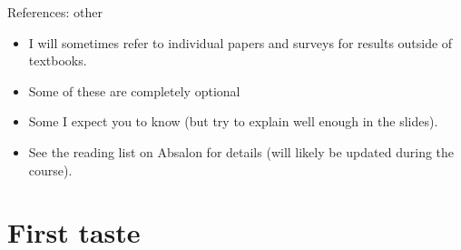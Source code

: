\documentclass[english,10pt
,aspectratio=169
]{beamer}
\begin{document}
\begin{frame}{References: other}
	\begin{itemize}
		\item I will sometimes refer to individual papers and surveys for results outside of textbooks.
		\item Some of these are completely optional 
		\item Some I expect you to know (but try to explain well enough in the slides).
		\item See the reading list on Absalon for details (will likely be updated during the course).
	\end{itemize}
\end{frame}




\section{First taste}
\end{document}
